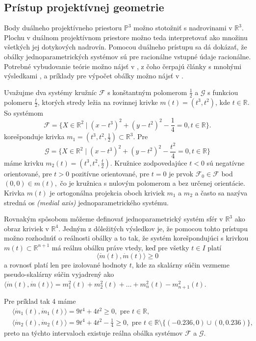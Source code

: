 \subsection{Prístup projektívnej geometrie}
Body duálneho projektívneho priestoru $\mathbb{P}^3 $ možno stotožniť s nadrovinami v $\mathbb{R}^3$. Plochu v duálnom projektívnom priestore možno teda interpretovať ako množinu všetkých jej dotykových nadrovín. Pomocou duálneho prístupu sa dá dokázať, že obálky jednoparametrických systémov sú pre racionálne vstupné údaje racionálne. Potrebné vybudovanie teórie možno nájsť v \cite{Pott01}, z čoho čerpajú články s mnohými výsledkami \cite{Pet08}, \cite{Pet98} a príklady pre výpočet obálky možno nájsť v \cite{Vra22}.
\begin{example}
Uvažujme dva systémy kružníc $\mathcal{F}$ s konštantným polomerom $\frac{1}{2}$ a $\mathcal{G}$ s funkciou polomeru $\frac{t}{2}$, ktorých stredy ležia na rovinnej krivke $m(t) = (t^3, t^2)$, kde $t \in \mathbb{R}.$
So systémom
$$ \mathcal{F} = \{ X \in \mathbb{R}^2 \mid (x - t^3)^2 + (y - t^2)^2 - \frac{1}{4} = 0, t \in \mathbb{R} \}.$$
korešponduje krivka $m_1 = (t^3, t^2, \frac{1}{2})\subset \mathbb{R}^3$.
Pre
$$ \mathcal{G} = \{ X \in \mathbb{R}^2 \mid (x - t^3)^2 + (y - t^2)^2 - \frac{t^2}{4} = 0, t \in \mathbb{R} \}$$
máme krivku $m_2(t) = (t^3, t^2, \frac{t}{2}).$
Kružnice zodpovedajúce $t < 0$ sú negatívne orientované, pre $t > 0$ pozitívne orientované, pre $t = 0$ je prvok $\mathcal{F}_0 \in \mathcal{F}$ bod $ (0, 0) \in m(t), $ čo je kružnica s nulovým polomerom a bez určenej orientácie.
Krivka $m(t)$ je ortogonálna projekcia oboch kriviek $m_1$ a $m_2$ a často sa nazýva stredná os \textit{(medial axis)} jednoparametrického systému.
\end{example}

Rovnakým spôsobom môžeme definovať jednoparametrický systém sfér v $\mathbb{R}^3$ ako obraz kriviek v $\mathbb{R}^4$.
Jedným z dôležitých výsledkov je, že pomocou tohto prístupu možno rozhodnúť o reálnosti obálky a to tak, že systém korešpondujúci s krivkou $m(t) \subset \mathbb{R}^{n+1}$ má reálnu obálku práve vtedy, keď pre všetky $t \in I $ platí 
$$\langle \dot{m}(t), \dot{m}(t) \rangle \geq 0$$ 
a rovnosť platí len pre izolované hodnoty $t$, kde za skalárny súčin vezmeme pseudo-skalárny súčin vyjadrený ako $\langle \dot{m}(t), \dot{m}(t) \rangle = m_1^2(t) + m_2^2(t) + \ldots + m_n^2(t) - m_{n+1}^2(t).$

Pre príklad tak 4 máme
\begin{align*}
&\langle \dot{m}_1(t), \dot{m}_1(t) \rangle = 9t^4 + 4t^2 \geq 0, \text{ pre } t \in \mathbb{R}, \\
&\langle \dot{m}_2(t), \dot{m}_2(t) \rangle = 9t^4 + 4t^2 - \frac{1}{4} \geq 0, \text{ pre } t \in \mathbb{R} \setminus \{ (-0.236, 0) \cup( 0, 0.236) \},
\end{align*}
preto na týchto intervaloch existuje reálna obálka systémov $\mathcal{F}$ a $\mathcal{G}$.

